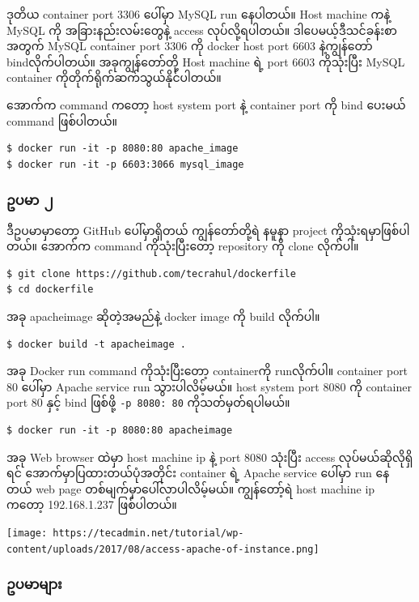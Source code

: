 \documentclass{article}
\begin{document}
ဒုတိယ container port 3306 ပေါ်မှာ MySQL run နေပါတယ်။ Host machine ကနဲ့
MySQL ကို အခြားနည်းလမ်းတွေနဲ့ access လုပ်လို့ရပါတယ်။
ဒါပေမယ့်ဒီသင်ခန်းစာအတွက် MySQL container port 3306 ကို docker host port
6603 နဲ့ကျွန်တော် bindလိုက်ပါတယ်။ အခုကျွန်တော်တို့ Host machine ရဲ့ port
6603 ကိုသုံးပြီး MySQL container ကိုတိုက်ရိုက်ဆက်သွယ်နိုင်ပါတယ်။

အောက်က command ကတော့ host system port နဲ့ container port ကို bind ပေးမယ်
command ဖြစ်ပါတယ်။

\begin{verbatim}
$ docker run -it -p 8080:80 apache_image
$ docker run -it -p 6603:3066 mysql_image
\end{verbatim}

\subsubsection{ဥပမာ ၂}\label{-1}

ဒီဥပမာမှာတော့ GitHub ပေါ်မှာရှိတယ် ကျွန်တော်တို့ရဲ နမူနာ project
ကိုသုံးရမှာဖြစ်ပါတယ်။ အောက်က command ကိုသုံးပြီးတော့ repository ကို
clone လိုက်ပါ။

\begin{verbatim}
$ git clone https://github.com/tecrahul/dockerfile
$ cd dockerfile
\end{verbatim}

အခု apacheimage ဆိုတဲ့အမည်နဲ့ docker image ကို build လိုက်ပါ။

\begin{verbatim} 
$ docker build -t apacheimage .
\end{verbatim}

အခု Docker run command ကိုသုံးပြီး‌တော့ containerကို runလိုက်ပါ။
container port 80 ပေါ်မှာ Apache service run သွားပါလိမ့်မယ်။ host system
port 8080 ကို container port 80 နှင့် bind ဖြစ်ဖို့ \texttt{-p 8080: 80}
ကိုသတ်မှတ်ရပါမယ်။

\begin{verbatim}
$ docker run -it -p 8080:80 apacheimage
\end{verbatim}

အခု Web browser ထဲမှာ host machine ip နဲ့ port 8080 သုံးပြီး access
လုပ်မယ်ဆိုလိုရှိရင် အောက်မှာပြထားတယ်ပုံအတိုင်း container ရဲ့ Apache
service ပေါ်မှာ run နေတယ် web page တစ်မျက်မှာပေါ်လာပါလိမ့်မယ်။
ကျွန်တော့်ရဲ host machine ip ကတော့ 192.168.1.237 ဖြစ်ပါတယ်။

\texttt{[image: https://tecadmin.net/tutorial/wp-content/uploads/2017/08/access-apache-of-instance.png]}

\subsubsection{ဥပမာများ}
\end{document}
